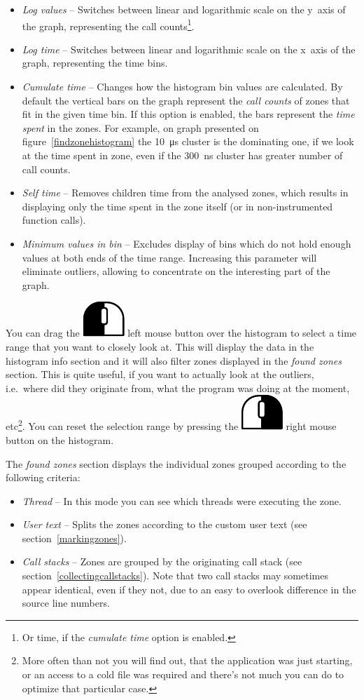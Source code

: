 \documentclass[hidelinks,titlepage,a4paper]{article}
\newcommand{\LMB}{\includegraphics[height=.8\baselineskip]{icons/lmb}}
\newcommand{\RMB}{\includegraphics[height=.8\baselineskip]{icons/rmb}}
\begin{document}
\begin{itemize}
\item \emph{Log values} -- Switches between linear and logarithmic scale on the y~axis of the graph, representing the call counts\footnote{Or time, if the \emph{cumulate time} option is enabled.}.
\item \emph{Log time} -- Switches between linear and logarithmic scale on the x~axis of the graph, representing the time bins.
\item \emph{Cumulate time} -- Changes how the histogram bin values are calculated. By default the vertical bars on the graph represent the \emph{call counts} of zones that fit in the given time bin. If this option is enabled, the bars represent the \emph{time spent} in the zones. For example, on graph presented on figure~\ref{findzonehistogram} the 10~\si{\micro\second} cluster is the dominating one, if we look at the time spent in zone, even if the 300~\si{\nano\second} cluster has greater number of call counts.
\item \emph{Self time} -- Removes children time from the analysed zones, which results in displaying only the time spent in the zone itself (or in non-instrumented function calls).
\item \emph{Minimum values in bin} -- Excludes display of bins which do not hold enough values at both ends of the time range. Increasing this parameter will eliminate outliers, allowing to concentrate on the interesting part of the graph.
\end{itemize}

You can drag the \LMB{} left mouse button over the histogram to select a time range that you want to closely look at. This will display the data in the histogram info section and it will also filter zones displayed in the \emph{found zones} section. This is quite useful, if you want to actually look at the outliers, i.e.\ where did they originate from, what the program was doing at the moment, etc\footnote{More often than not you will find out, that the application was just starting, or an access to a cold file was required and there's not much you can do to optimize that particular case.}. You can reset the selection range by pressing the \RMB{} right mouse button on the histogram.

The \emph{found zones} section displays the individual zones grouped according to the following criteria:

\begin{itemize}
\item \emph{Thread} -- In this mode you can see which threads were executing the zone.
\item \emph{User text} -- Splits the zones according to the custom user text (see section~\ref{markingzones}).
\item \emph{Call stacks} -- Zones are grouped by the originating call stack (see section~\ref{collectingcallstacks}). Note that two call stacks may sometimes appear identical, even if they not, due to an easy to overlook difference in the source line numbers.
\end{itemize}
\end{document}
